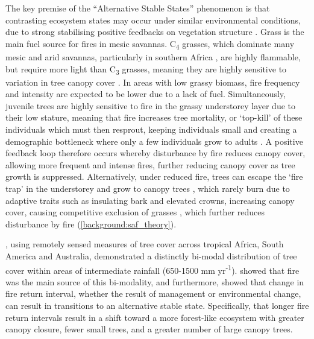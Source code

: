 \begin{refsection}
The key premise of the ``Alternative Stable States'' phenomenon is that contrasting ecosystem states may occur under similar environmental conditions, due to strong stabilising positive feedbacks on vegetation structure \citep{Staver2011}. Grass is the main fuel source for fires in mesic savannas. C\textsubscript{4} grasses, which dominate many mesic and arid savannas, particularly in southern Africa \citep{Still2003}, are highly flammable, but require more light than C\textsubscript{3} grasses, meaning they are highly sensitive to variation in tree canopy cover \citep{CharlesDominique2018}. In areas with low grassy biomass, fire frequency and intensity are expected to be lower due to a lack of fuel. Simultaneously, juvenile trees are highly sensitive to fire in the grassy understorey layer due to their low stature, meaning that fire increases tree mortality, or `top-kill' of these individuals which must then resprout, keeping individuals small and creating a demographic bottleneck where only a few individuals grow to adults \citep{Bond1995, Ryan2011}. A positive feedback loop therefore occurs whereby disturbance by fire reduces canopy cover, allowing more frequent and intense fires, further reducing canopy cover as tree growth is suppressed. Alternatively, under reduced fire, trees can escape the `fire trap' in the understorey and grow to canopy trees \citep{Wakeling2011}, which rarely burn due to adaptive traits such as insulating bark and elevated crowns, increasing canopy cover, causing competitive exclusion of grasses \citep{Moustakas2013}, which further reduces disturbance by fire (\autoref{background:saf_theory}). 

\citet{Hirota2011}, using remotely sensed measures of tree cover across tropical Africa, South America and Australia, demonstrated a distinctly bi-modal distribution of tree cover within areas of intermediate rainfall (\textapprox{}650-1500 mm yr\textsuperscript{-1}). \citet{Staver2011} showed that fire was the main source of this bi-modality, and furthermore, \citet{Staver2017} showed that change in fire return interval, whether the result of management or environmental change, can result in transitions to an alternative stable state. Specifically, that longer fire return intervals result in a shift toward a more forest-like ecosystem with greater canopy closure, fewer small trees, and a greater number of large canopy trees.


\end{refsection}
